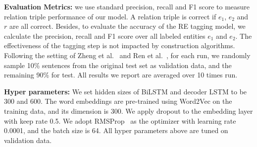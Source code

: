 

\noindent
\textbf{Evaluation Metrics:}
we use standard precision, recall and F1 score to measure relation triple
performance of our model.
A relation triple is correct if $e_1$, $e_2$ and $r$ are all correct.
Besides, to evaluate the accuracy of the RE tagging model,
we calculate the precision, recall and F1 score over all labeled entities $e_1$ and $e_2$.
The effectiveness of the tagging step is not impacted by construction algorithms.
Following the setting of Zheng et al.~ and Ren et al.~,
for each run, we randomly sample 10\% sentences from the original test set as validation data,
and the remaining 90\% for test. All results we report are averaged over 10
times run.

\noindent
\textbf{Hyper parameters:}
We set hidden sizes of BiLSTM and decoder LSTM to be 300 and 600. 
The word embeddings are pre-trained using Word2Vec \cite{mikolov2013distributed}
on the training data, and its dimension is 300.
We apply dropout to the embedding layer with keep rate 0.5.
We adopt RMSProp~\cite{tieleman2012lecture} as the optimizer with learning rate 0.0001,
and the batch size is 64.
All hyper parameters above are tuned on validation data.







